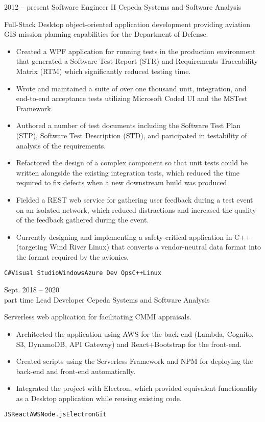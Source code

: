 \documentclass[9pt]{developercv} %
\begin{document}
\begin{entrylist}
	\entry
		{2012 -- present}
		{Software Engineer II}
		{Cepeda Systems and Software Analysis}
		{Full-Stack Desktop object-oriented application development providing aviation GIS mission planning capabilities for the Department of Defense.\\
		\begin{itemize}
			\item Created a WPF application for running tests in the production environment that generated a Software Test Report (STR) and Requirements Traceability Matrix (RTM) which significantly reduced testing time.
			\item Wrote and maintained a suite of over one thousand unit, integration, and end-to-end acceptance tests utilizing Microsoft Coded UI and the MSTest Framework.
			\item Authored a number of test documents including the Software Test Plan (STP), Software Test Description (STD), and paricipated in testability of analysis of the requirements.
			\item Refactored the design of a complex component so that unit tests could be written alongside the existing integration tests, which reduced the time required to fix defects when a new downstream build was produced.
			\item Fielded a REST web service for gathering user feedback during a test event on an isolated network, which reduced distractions and increased the quality of the feedback gathered during the event.
			\item Currently designing and implementing a safety-critical application in C++ (targeting Wind River Linux) that converts a vendor-neutral data format into the format required by the avionics. 
		\end{itemize}
		\texttt{C\#}\slashsep\texttt{Visual Studio}\slashsep\texttt{Windows}\slashsep\texttt{Azure Dev Ops}\slashsep\texttt{C++}\slashsep\texttt{Linux}}
	\entry
		{Sept. 2018 -- 2020\\\footnotesize{part time}}
		{Lead Developer}
		{Cepeda Systems and Software Analysis}
		{Serverless web application for facilitating CMMI appraisals.\\
		\begin{itemize}
			\item Architected the application using AWS for the back-end (Lambda, Cognito, S3, DynamoDB, API Gateway) and React+Bootstrap for the front-end.
			\item Created scripts using the Serverless Framework and NPM for deploying the back-end and front-end automatically. 
			\item Integrated the project with Electron, which provided equivalent functionality as a Desktop application while reusing existing code.
		\end{itemize}
		\texttt{JS}\slashsep\texttt{React}\slashsep\texttt{AWS}\slashsep\texttt{Node.js}\slashsep\texttt{Electron}\slashsep\texttt{Git}}
\end{entrylist}
\end{document}

